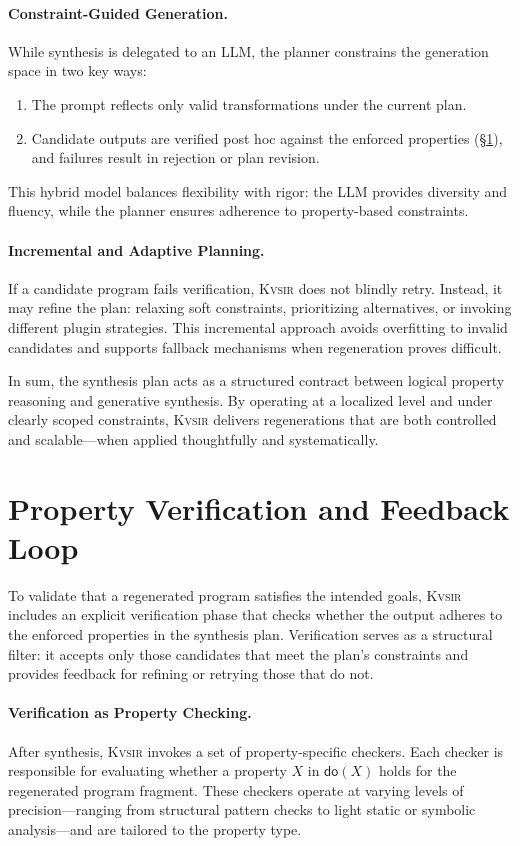 \documentclass[sigplan]{acmart}
\newcommand{\sys}{{\scshape Kv{\textalpha}sir}\xspace}
\begin{document}
\paragraph{Constraint-Guided Generation.}
While synthesis is delegated to an LLM, the planner constrains the generation space in two key ways:
\begin{enumerate}
  \item The prompt reflects only valid transformations under the current plan.
  \item Candidate outputs are verified post hoc against the enforced properties (§\ref{sec:verification}), and failures result in rejection or plan revision.
\end{enumerate}
This hybrid model balances flexibility with rigor: the LLM provides diversity and fluency, while the planner ensures adherence to property-based constraints.

\paragraph{Incremental and Adaptive Planning.}
If a candidate program fails verification, \sys does not blindly retry. Instead, it may refine the plan: relaxing soft constraints, prioritizing alternatives, or invoking different plugin strategies. This incremental approach avoids overfitting to invalid candidates and supports fallback mechanisms when regeneration proves difficult.

In sum, the synthesis plan acts as a structured contract between logical property reasoning and generative synthesis. By operating at a localized level and under clearly scoped constraints, \sys delivers regenerations that are both controlled and scalable—when applied thoughtfully and systematically.

\section{Property Verification and Feedback Loop}
\label{sec:verification}

To validate that a regenerated program satisfies the intended goals, \sys includes an explicit verification phase that checks whether the output adheres to the enforced properties in the synthesis plan. Verification serves as a structural filter: it accepts only those candidates that meet the plan’s constraints and provides feedback for refining or retrying those that do not.

\paragraph{Verification as Property Checking.}
After synthesis, \sys invokes a set of property-specific checkers. Each checker is responsible for evaluating whether a property $X$ in $\mathsf{do}(X)$ holds for the regenerated program fragment. These checkers operate at varying levels of precision—ranging from structural pattern checks to light static or symbolic analysis—and are tailored to the property type.
\end{document}
